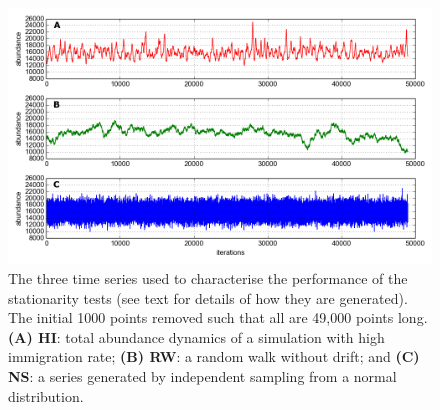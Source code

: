   
\begin{figure}[ht]
	\centering
	\includegraphics[width=0.8\linewidth]{"./chapters/chapter04b/figures/hi_rw_ns_dynamics"}
     \caption{The three time series used to characterise the performance of the stationarity tests (see text for details of how they are generated). The initial 1000 points removed such that all are 49,000 points long. \textbf{(A) HI}: total abundance dynamics of a simulation with high immigration rate; \textbf{(B) RW}: a random walk without drift; and \textbf{(C) NS}: a series generated by independent sampling from a normal distribution.} 
     \label{fig:adf}   
\end{figure}

